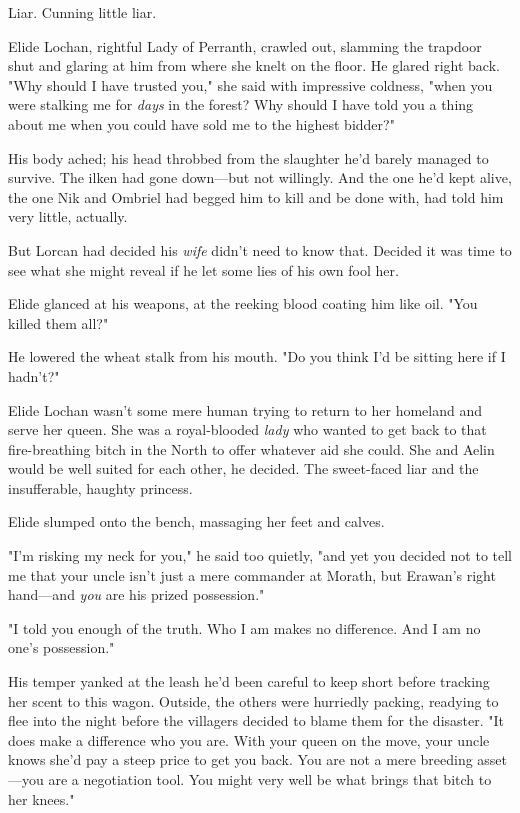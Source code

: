 Liar. Cunning little liar.

Elide Lochan, rightful Lady of Perranth, crawled out, slamming the trapdoor shut and glaring at him from where she knelt on the floor. He glared right back. "Why should I have trusted you," she said with impressive coldness, "when you were stalking me for \emph{days} in the forest? Why should I have told you a thing about me when you could have sold me to the highest bidder?"

His body ached; his head throbbed from the slaughter he'd barely managed to survive. The ilken had gone down---but not willingly. And the one he'd kept alive, the one Nik and Ombriel had begged him to kill and be done with, had told him very little, actually.

But Lorcan had decided his \emph{wife} didn't need to know that. Decided it was time to see what she might reveal if he let some lies of his own fool her.

Elide glanced at his weapons, at the reeking blood coating him like oil. "You killed them all?"

He lowered the wheat stalk from his mouth. "Do you think I'd be sitting here if I hadn't?"

Elide Lochan wasn't some mere human trying to return to her homeland and serve her queen. She was a royal-blooded \emph{lady} who wanted to get back to that fire-breathing bitch in the North to offer whatever aid she could. She and Aelin would be well suited for each other, he decided. The sweet-faced liar and the insufferable, haughty princess.

Elide slumped onto the bench, massaging her feet and calves.

"I'm risking my neck for you," he said too quietly, "and yet you decided not to tell me that your uncle isn't just a mere commander at Morath, but Erawan's right hand---and \emph{you} are his prized possession."

"I told you enough of the truth. Who I am makes no difference. And I am no one's possession."

His temper yanked at the leash he'd been careful to keep short before tracking her scent to this wagon. Outside, the others were hurriedly packing, readying to flee into the night before the villagers decided to blame them for the disaster. "It does make a difference who you are. With your queen on the move, your uncle knows she'd pay a steep price to get you back. You are not a mere breeding asset---you are a negotiation tool. You might very well be what brings that bitch to her knees."

